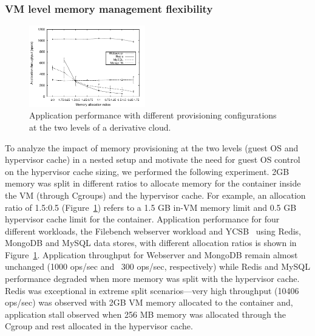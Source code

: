 \subsubsection{VM level memory management flexibility}
\label{subsec:sdc}
%
%
\begin{figure}[t]
  \centering
\includegraphics[width=0.45\textwidth]{images/appl_behavior} 
 \caption{Application performance with different provisioning configurations 
  at the two levels of a derivative cloud.}
 \label{fig:app_behavior} 
\end{figure}
%
To analyze the impact of memory provisioning at the two 
levels (guest OS and hypervisor cache) in a nested setup and motivate the need for 
guest OS control on the hypervisor cache sizing, we performed the 
following experiment.
%
2GB memory was split in different ratios to allocate memory for the container 
inside the VM (through Cgroups) and the hypervisor cache.
%
For example, an allocation ratio of 1.5:0.5 (Figure~\ref{fig:app_behavior}) refers to
a 1.5 GB in-VM memory limit and 0.5 GB hypervisor cache limit for
the container. 
%
Application performance for four different workloads,
the Filebench webserver workload and YCSB~\cite{ycsb} using 
Redis, MongoDB and MySQL data stores,
with different allocation ratios is shown in 
Figure~\ref{fig:app_behavior}. 
%
Application throughput for Webserver and MongoDB remain almost unchanged 
(1000 ops/sec and ~300 ops/sec, respectively) while Redis and MySQL performance 
degraded when more memory was split with the hypervisor cache.
%
Redis was exceptional in extreme split scenarios---very high throughput (10406 ops/sec) was
observed with 2GB VM memory allocated to the container and, application stall observed when 256 MB 
memory was allocated through the Cgroup and rest allocated in the hypervisor cache.
%
